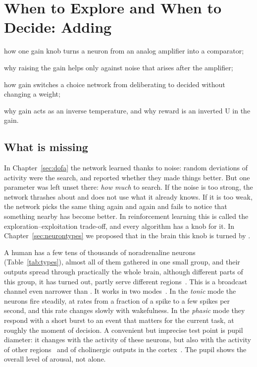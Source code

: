 \chapter{When to Explore and When to Decide: Adding }
\label{sec:nora}
\begin{chaptergoals}
\item how one gain knob turns a neuron from an analog amplifier into a comparator;
\item why raising the gain helps only against noise that arises after the amplifier;
\item how gain switches a choice network from deliberating to decided without changing a weight;
\item why gain acts as an inverse temperature, and why reward is an inverted U in the gain.
\end{chaptergoals}

\section{What is missing}

In Chapter~\ref{sec:dofa} the network learned thanks to noise: random deviations of activity were the search, and  reported whether they made things better. But one parameter was left unset there: \emph{how much} to search. If the noise is too strong, the network thrashes about and does not use what it already knows. If it is too weak, the network picks the same thing again and again and fails to notice that something nearby has become better. In reinforcement learning this is called the exploration--exploitation trade-off, and every algorithm has a knob for it. In Chapter~\ref{sec:neurontypes} we proposed that in the brain this knob is turned by .

A human has a few tens of thousands of noradrenaline neurons (Table~\ref{tab:types}), almost all of them gathered in one small group, and their outputs spread through practically the whole brain, although different parts of this group, it has turned out, partly serve different regions~\cite{Poe2020}. This is a broadcast channel even narrower than . It works in two modes~\cite{AstonJones2005}. In the \emph{tonic} mode the neurons fire steadily, at rates from a fraction of a spike to a few spikes per second, and this rate changes slowly with wakefulness. In the \emph{phasic} mode they respond with a short burst to an event that matters for the current task, at roughly the moment of decision. A convenient but imprecise test point is pupil diameter: it changes with the activity of these neurons, but also with the activity of other regions~\cite{Joshi2016} and of cholinergic outputs in the cortex~\cite{Reimer2016}. The pupil shows the overall level of arousal, not  alone.

